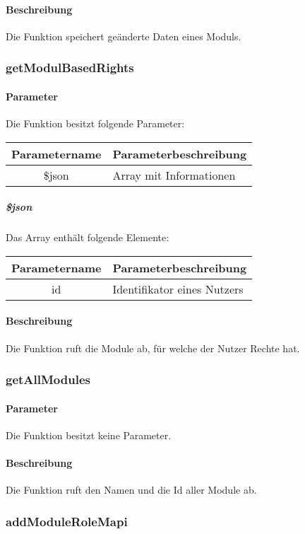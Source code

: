 \paragraph{Beschreibung} Die Funktion speichert geänderte Daten eines Moduls.
\subsubsection{getModulBasedRights}
\paragraph{Parameter} Die Funktion besitzt folgende Parameter:
\begin{table}[H]
	\begin{tabular}{|c|p{11cm}|}
		\hline
		\textbf{Parametername} & \textbf{Parameterbeschreibung} \\ \hline
		\$json & Array mit Informationen \\ \hline
	\end{tabular}
\end{table}
\subparagraph{\$json}Das Array enthält folgende Elemente:
\begin{table}[H]
	\begin{tabular}{|c|p{11cm}|}
		\hline
		\textbf{Parametername} & \textbf{Parameterbeschreibung} \\ \hline
		id     & Identifikator eines Nutzers \\ \hline
	\end{tabular}
\end{table}
\paragraph{Beschreibung} Die Funktion ruft die Module ab, für welche der Nutzer Rechte hat.
\subsubsection{getAllModules}
\paragraph{Parameter} Die Funktion besitzt keine Parameter.
\paragraph{Beschreibung} Die Funktion ruft den Namen und die Id aller Module ab.
\subsubsection{addModuleRoleMapi}
